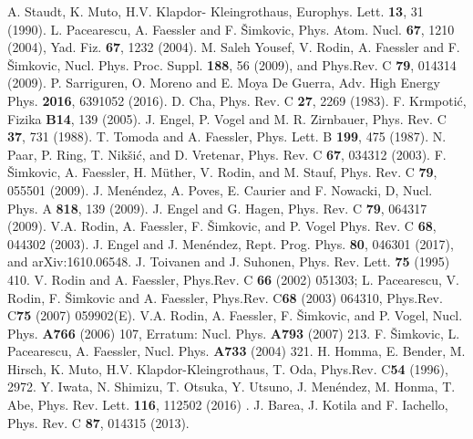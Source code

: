 \documentclass[nofootinbib,twocolumn,eqsecnum,floats,aps]{revtex4}
\begin{document}
{\begin{thebibliography}{99}
 A. Staudt, K. Muto, H.V. Klapdor- Kleingrothaus,
Europhys. Lett. \textbf{13}, 31 (1990).
 L. Pacearescu, A. Faessler and F. \v Simkovic,
Phys.  Atom. Nucl. \textbf{67}, 1210 (2004), Yad. Fiz. \textbf{67}, 1232 (2004).
 M. Saleh Yousef, V. Rodin, A. Faessler and F. \v Simkovic,
Nucl. Phys. Proc. Suppl. \textbf{188}, 56 (2009),
and Phys.Rev. C \textbf{79}, 014314 (2009).
 P. Sarriguren, O. Moreno and E. Moya De Guerra,
Adv. High Energy Phys. \textbf{2016},  6391052  (2016).
 D. Cha,
Phys. Rev. C \textbf{27}, 2269 (1983).
   F. Krmpoti\'c,
Fizika {\bf B14}, 139 (2005).
 J. Engel, P. Vogel and M. R. Zirnbauer,
Phys. Rev. C \textbf{37}, 731 (1988).
T. Tomoda and A. Faessler,
Phys. Lett. B \textbf{199}, 475 (1987).
   N. Paar, P. Ring, T. Nik\v si\'c, and  D. Vretenar,
Phys. Rev. C {\bf 67}, 034312 (2003).
 F. \v Simkovic,  A. Faessler, H. M\"uther, V. Rodin,
and M. Stauf,  Phys.  Rev. C {\bf {79}}, 055501 (2009).
 J. Men\'endez, A. Poves, E. Caurier and F. Nowacki, D,
Nucl. Phys.  A \textbf{818}, 139 (2009).
 J. Engel and G. Hagen,
Phys. Rev. C \textbf{79}, 064317 (2009).
  V.A. Rodin,     A. Faessler, F. \v Simkovic, and P. Vogel
Phys. Rev. C {\bf 68}, 044302 (2003).
 J. Engel and  J. Men\'endez, Rept. Prog. Phys.  \textbf{80}, 046301 (2017), and
arXiv:1610.06548.
  J. Toivanen and J. Suhonen, Phys. Rev. Lett.  \textbf{75} (1995) 410.
 V. Rodin and A. Faessler, Phys.Rev. C  \textbf{66}  (2002) 051303; L. Pacearescu, V. Rodin, F. \v Simkovic and A. Faessler, Phys.Rev. C\textbf{68} (2003) 064310,  Phys.Rev. C\textbf{75} (2007) 059902(E).
 V.A. Rodin, A. Faessler, F.  \v Simkovic, and
P. Vogel, Nucl. Phys. \textbf{A766} (2006) 107,
Erratum: Nucl. Phys. \textbf{A793} (2007) 213.
 F. \v Simkovic, L. Pacearescu, A. Faessler, Nucl. Phys. \textbf{A733} (2004) 321.
 H. Homma, E. Bender, M. Hirsch, K. Muto, H.V. Klapdor-Kleingrothaus, T. Oda, Phys.Rev. C\textbf{54}  (1996), 2972.
 Y. Iwata, N. Shimizu, T. Otsuka, Y. Utsuno, J. Men\'endez,
M. Honma, T. Abe, Phys. Rev. Lett. {\bf {116}}, 112502 (2016) .
 J. Barea, J. Kotila and F. Iachello,
Phys. Rev. C \textbf{87}, 014315 (2013).

\end{thebibliography}}
\end{document}
